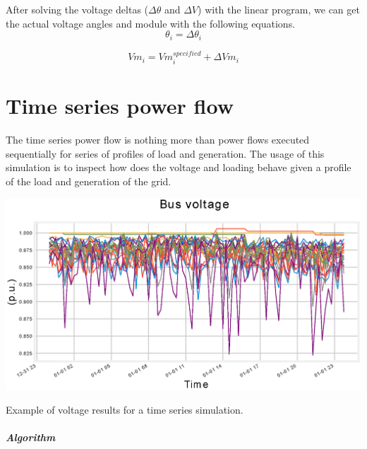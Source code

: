 \documentclass[nols,a4paper,twoside,notoc,fleqn]{tufte-book}
\begin{document}
After solving the voltage deltas ($\Delta \theta$ and $\Delta V$) with the linear program,  we can get the actual voltage angles and module with the following equations.	
\begin{equation}
\theta_i = \Delta \theta_i
\end{equation}
	
\begin{equation}
Vm_i = Vm_i^{specified} + \Delta Vm_i
\end{equation}

\chapter{Time series power flow}

The time series power flow is nothing more than power flows executed sequentially for series of profiles of load and generation. The usage of this simulation is to inspect how does the voltage and loading behave given a profile of the load and generation of the grid.

\begin{marginfigure}
	\includegraphics[width=\linewidth]{img/Time_series.eps}
	\caption{Example of voltage results for a time series simulation.}
	\label{fig:time_series}
\end{marginfigure}

\paragraph{Algorithm}
\end{document}
